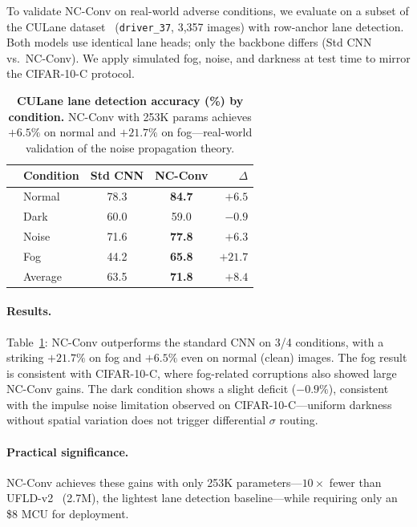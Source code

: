 \documentclass[10pt,twocolumn,letterpaper]{article}
\begin{document}
To validate NC-Conv on real-world adverse conditions, we evaluate on a subset of the CULane dataset~\cite{pan2018culane} (\texttt{driver\_37}, 3,357 images) with row-anchor lane detection.
Both models use identical lane heads; only the backbone differs (Std CNN vs.\ NC-Conv).
We apply simulated fog, noise, and darkness at test time to mirror the CIFAR-10-C protocol.

\begin{table}[t]
\centering
\caption{\textbf{CULane lane detection accuracy (\%) by condition.} NC-Conv with 253K params achieves $+6.5\%$ on normal and $+21.7\%$ on fog---real-world validation of the noise propagation theory.}
\label{tab:culane}
\footnotesize
\begin{tabular}{@{}llcc r@{}}
\toprule
& \textbf{Condition} & \textbf{Std CNN} & \textbf{NC-Conv} & $\Delta$ \\
\midrule
& Normal      & 78.3 & \textbf{84.7} & $\mathbf{+6.5}$ \\
& Dark        & 60.0 & 59.0          & $-0.9$ \\
& Noise       & 71.6 & \textbf{77.8} & $+6.3$ \\
& Fog         & 44.2 & \textbf{65.8} & $\mathbf{+21.7}$ \\
\midrule
& Average     & 63.5 & \textbf{71.8} & $\mathbf{+8.4}$ \\
\bottomrule
\end{tabular}
\end{table}

\paragraph{Results.}
Table~\ref{tab:culane}: NC-Conv outperforms the standard CNN on 3/4 conditions, with a striking $+21.7\%$ on fog and $+6.5\%$ even on normal (clean) images.
The fog result is consistent with CIFAR-10-C, where fog-related corruptions also showed large NC-Conv gains.
The dark condition shows a slight deficit ($-0.9\%$), consistent with the impulse noise limitation observed on CIFAR-10-C---uniform darkness without spatial variation does not trigger differential $\sigma$ routing.

\paragraph{Practical significance.}
NC-Conv achieves these gains with only 253K parameters---$10\times$ fewer than UFLD-v2~\cite{qin2020ultrafast} (2.7M), the lightest lane detection baseline---while requiring only an \$8 MCU for deployment.
\end{document}
